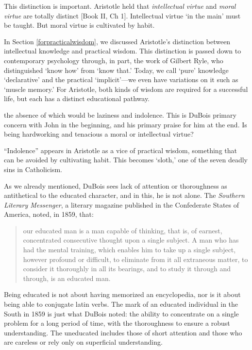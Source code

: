 This distinction is important. Aristotle held that \emph{intellectual virtue} and \emph{moral virtue} are totally distinct [Book II, Ch 1]. Intellectual virtue `in the main' must be taught. But moral virtue is cultivated by habit. 

In Section \ref{forpracticalwisdom}, we discussed Aristotle's distinction between intellectual knowledge and practical wisdom. This distinction is passed down to contemporary psychology through, in part, the work of Gilbert Ryle, who distinguished `know how' from `know that.' Today, we call `pure' knowledge `declarative' and the practical `implicit'---we even have variations on it such as `muscle memory.' For Aristotle, both kinds of wisdom are required for a successful life, but each has a distinct educational pathway.

 the absence of which would be laziness and indolence. This is DuBois primary concern with John in the beginning, and his primary praise for him at the end. Is being hardworking and tenacious a moral or intellectual virtue?

``Indolence'' appears in Aristotle as a vice of practical wisdom, something that can be avoided by cultivating habit. This becomes `sloth,' one of the seven deadly sins in Catholicism. 

As we already mentioned, DuBois sees lack of attention or thoroughness as antithetical to the educated character, and in this, he is not alone. The \emph{Southern Literary Messenger}, a literary magazine published in the Confederate States of America, noted, in 1859, that:

\begin{quote}

our educated man is a man capable of thinking, that is, of earnest, concentrated consecutive thought upon a single subject. A man who has had the mental training, which enables him to take up a single subject, however profound or difficult, to eliminate from it all extraneous matter, to consider it thoroughly in all its bearings, and to study it through and through, is an educated man. ~\citep[p.307]{:1859ts}
\end{quote}

Being educated is not about having memorized an encyclopedia, nor is it about being able to conjugate latin verbs. The mark of an educated individual in the South in 1859 is just what DuBois noted: the ability to concentrate on a single problem for a long period of time, with the thoroughness to ensure a robust understanding. The uneducated includes those of short attention and those who are careless or rely only on superficial understanding.

